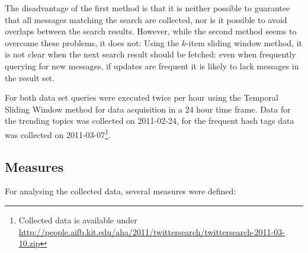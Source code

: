 \documentclass{llncs}
\begin{document}
The disadvantage of the first method is that it is neither possible to guarantee that all messages matching the search are collected, nor is it possible to avoid overlaps between the search results. However, while the second method seems to overcome these problems, it does not: Using the $k$-item sliding window method, it is not clear when the next search result should be fetched: even when frequently querying for new messages, if updates are frequent it is likely to lack messages in the result set.

For both data set queries were executed twice per hour using the Temporal
Sliding Window method for data acquisition in a 24 hour time frame. Data for the
trending topics was collected on 2011-02-24, for the frequent hash tags data was
collected on 2011-03-07\footnote{Collected data is available under
\url{http://people.aifb.kit.edu/aha/2011/twittersearch/twittersearch-2011-03-10.zip}}.

\subsection{Measures}

For analysing the collected data, several measures were defined:
\end{document}
